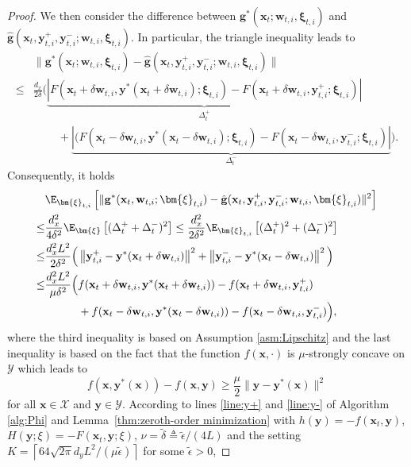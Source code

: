 \documentclass[11pt]{article}
\def\vg{\mathbf{g}}
\def\vw{\mathbf{w}}
\def\vx{\mathbf{x}}
\def\vy{\mathbf{y}}
\def\vxi{\bm{\xi}}
\def\fX{{\mathcal{X}}}
\def\fY{{\mathcal{Y}}}
\newcommand{\norm}[1]{\left\| #1 \right\|}
\begin{document}
\begin{proof}
We then consider the difference between $\vg^*(\vx_t;\vw_{t,i},\vxi_{t,i})$ and $\hat{\vg}(\vx_t,\vy_{t,i}^+,\vy_{t,i}^-;\vw_{t,i},\vxi_{t,i})$.
In particular, the triangle inequality leads to
\begin{align*}
&\|\vg^*(\vx_t;\vw_{t,i},\vxi_{t,i})-\hat{\vg}(\vx_t,\vy_{t,i}^+,\vy_{t,i}^-;\vw_{t,i},\vxi_{t,i})\| \\
\le & \frac{d_x}{2\delta}
\Bigg(
\underbrace{\left |F(\vx_t+\delta\vw_{t,i},\vy^*(\vx_t+\delta\vw_{t,i});\vxi_{t,i})-F(\vx_t+\delta\vw_{t,i},\vy_{t,i}^+;\vxi_{t,i})\right |}_{\Delta_t^+} 
\\
& ~\quad\quad + \underbrace{\left |(F(\vx_t-\delta\vw_{t,i},\vy^*(\vx_t-\delta\vw_{t,i});\vxi_{t,i}) -  F(\vx_t -\delta\vw_{t,i},\vy_{t,i}^-;\vxi_{t,i})\right|}_{\Delta_t^-}\Bigg).
\end{align*}
Consequently, it holds
\begin{align}\label{eq:diff-g-star-g-hat}
\begin{split}    
&\E_{\vxi_{t,i}} \left[\|\vg^*(\vx_t,\vw_{t,i};\vxi_{t,i}) - \hat{\vg}(\vx_t,\vy_{t,i}^+,\vy_{t,i}^-;\vw_{t,i},\vxi_{t,i})\|^2\right]\\
\le & \frac{d_x^2}{4\delta^2}
\E_{\vxi}\left[(\Delta_t^+ +\Delta_t^-)^2\right]
\le \frac{d_x^2}{2\delta^2}
\E_{\vxi_{t,i}}\left[(\Delta_t^+)^2 +(\Delta_t^-)^2\right] \\
\le & \frac{d_x^2L^2}{2\delta^2}\Big(\norm{\vy_{t,i}^+ - \vy^*(\vx_t+\delta\vw_{t,i})}^2+\norm{\vy_{t,i}^- - \vy^*(\vx_t-\delta\vw_{t,i})}^2 \Big) \\
\le & \frac{d_x^2L^2}{\mu \delta^2}\Big( f(\vx_t+\delta\vw_{t,i},\vy^*(\vx_t+\delta\vw_{t,i})) - f(\vx_t+\delta\vw_{t,i},\vy_{t,i}^+) \\
& \qquad\quad + f(\vx_t - \delta\vw_{t,i}, \vy^*(\vx_t - \delta\vw_{t,i})) - f(\vx_t - \delta\vw_{t,i}, \vy_{t,i}^-) \Big), 
\end{split}
\end{align}
where the third inequality is based on Assumption \ref{asm:Lipschitz} and the last inequality is based on the fact that the function $f(\vx,\cdot)$ is $\mu$-strongly concave on $\fY$ which leads to
\[
f(\vx,\vy^*(\vx)) - f(\vx,\vy) \ge \frac{\mu}{2}\|\vy-\vy^*(\vx)\|^2 
\]
for all $\vx\in\fX$ and $\vy\in\fY$.
According to lines \ref{line:y+} and \ref{line:y-} of Algorithm \ref{alg:Phi} and Lemma~\ref{thm:zeroth-order minimization} with
$h(\vy)=-f(\vx_t,\vy)$, $H(\vy;\xi)=-F(\vx_t,\vy;\xi)$, {$\nu=\tilde\delta\triangleq\tilde\epsilon/(4L)$} and the setting $K=\left\lceil{64\sqrt{2\pi}d_yL^2}/(\mu\tilde\epsilon)\right\rceil$ for some $\tilde\epsilon>0$,

\end{proof}
\end{document}
